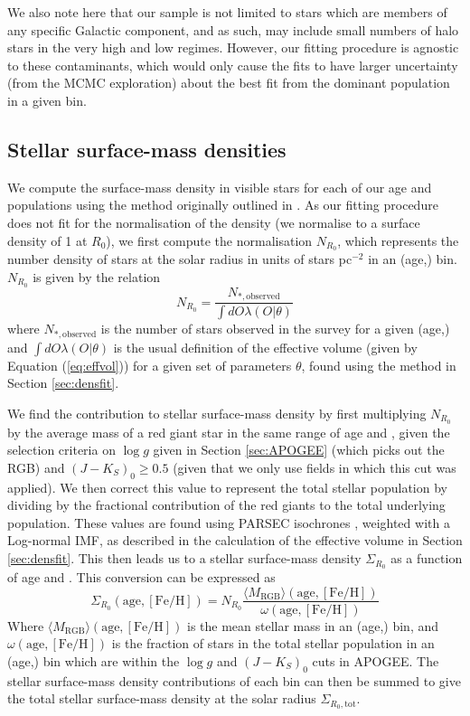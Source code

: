 We also note here that our sample is not limited to stars which are members of any specific Galactic component, and as such, may include small numbers of halo stars in the very high \afe{} and low \feh{} regimes. However, our fitting procedure is agnostic to these contaminants, which would only cause the fits to have larger uncertainty (from the MCMC exploration) about the best fit from the dominant population in a given bin.

\subsection{Stellar surface-mass densities}
\label{sec:surfmasscalc}
We compute the surface-mass density in visible stars for each of our age and \feh{} populations using the method originally outlined in \citet{2012ApJ...751..131B}. As our fitting procedure does not fit for the normalisation of the density (we normalise to a surface density of 1 at $R_0$), we first compute the normalisation $N_{R_0}$, which represents the number density of stars at the solar radius in units of stars pc$^{-2}$ in an (age,\feh{}) bin. $N_{R_0}$ is given by the relation 
\begin{equation}
N_{R_0} = \frac{N_{*,\text{observed}}}{\int dO \lambda(O|\theta)}
\end{equation}
where $N_{*,\text{observed}}$ is the number of stars observed in the survey for a given (age,\feh{}) and $\int dO \lambda(O|\theta)$ is the usual definition of the effective volume (given by Equation (\ref{eq:effvol})) for a given set of parameters $\theta$, found using the method in Section \ref{sec:densfit}. 

We find the contribution to stellar surface-mass density by first multiplying $N_{R_0}$ by the average mass of a red giant star in the same range of age and \feh{}, given the selection criteria on $\log{g}$ given in Section \ref{sec:APOGEE} (which picks out the RGB) and  $(J-K_S)_0 \geq 0.5$ (given that we only use fields in which this cut was applied).  We then correct this value to represent the total stellar population by dividing by the fractional contribution of the red giants to the total underlying population. These values are found using PARSEC isochrones \citep{2012MNRAS.427..127B}, weighted with a Log-normal \citet{2001ApJ...554.1274C} IMF, as described in the calculation of the effective volume in Section \ref{sec:densfit}. This then leads us to a stellar surface-mass density $\Sigma_{R_0}$ as a function of age and \feh{}. This conversion can be expressed as
\begin{equation}
\Sigma_{R_0}(\mathrm{age,[Fe/H]}) = N_{R_0} \frac{\langle M_{\text{RGB}} \rangle (\mathrm{age,[Fe/H]})}{\omega(\mathrm{age,[Fe/H]})}
\end{equation}
Where $\langle M_{\text{RGB}} \rangle (\mathrm{age,[Fe/H]})$ is the mean stellar mass in an (age,\feh{}) bin, and $\omega(\mathrm{age,[Fe/H]})$ is the fraction of stars in the total stellar population in an (age,\feh{}) bin which are within the $\log{g}$ and $(J-K_S)_0$ cuts in APOGEE. The stellar surface-mass density contributions of each bin can then be summed to give the total stellar surface-mass density at the solar radius $\Sigma_{R_0, \text{tot}}$.

